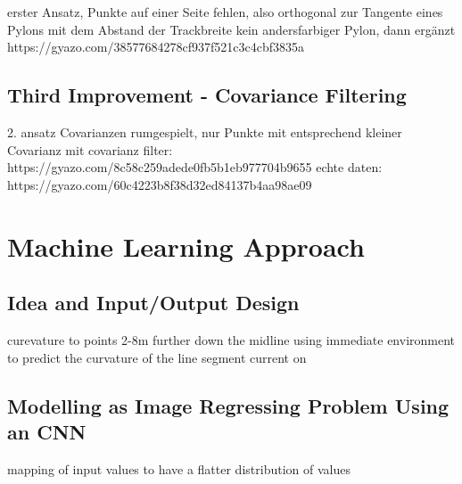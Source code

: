 erster Ansatz, Punkte auf einer Seite fehlen,
also orthogonal zur Tangente eines Pylons mit dem Abstand der Trackbreite kein andersfarbiger Pylon, dann ergänzt
https://gyazo.com/38577684278cf937f521c3c4cbf3835a

\subsection{Third Improvement - Covariance Filtering}

2. ansatz Covarianzen rumgespielt, nur Punkte mit entsprechend kleiner Covarianz
mit covarianz filter: https://gyazo.com/8c58c259adede0fb5b1eb977704b9655
echte daten:
https://gyazo.com/60c4223b8f38d32ed84137b4aa98ae09

\section{Machine Learning Approach}
\subsection{Idea and Input/Output Design}
curevature to points 2-8m further down the midline
using immediate environment to predict the curvature of the line segment current on
\subsection{Modelling as Image Regressing Problem Using an CNN}
mapping of input values to have a flatter distribution of values
